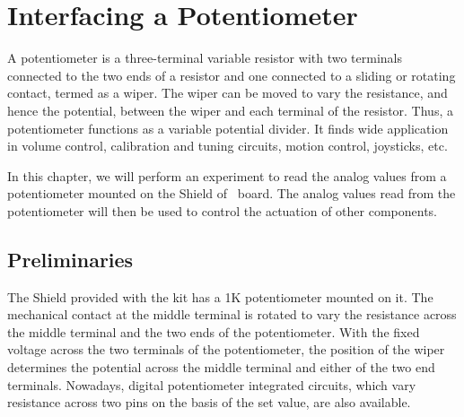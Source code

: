 \chapter{Interfacing a Potentiometer}
\thispagestyle{empty}
\label{potmeter}

\newcommand{\LocPotfig}{\Origin/user-code/pot/figures}
\newcommand{\LocPotscicode}{\Origin/user-code/pot/scilab}
\newcommand{\LocPotscibrief}[1]{{\tt
    \seqsplit{Origin/user-code/pot/scilab/#1}}, 
see \fnrefp{fn:file-loc}}
\newcommand{\LocPotardcode}{\Origin/user-code/pot/arduino}
\newcommand{\LocPotardbrief}[1]{{\tt
    \seqsplit{Origin/user-code/pot/arduino/#1}},
see \fnrefp{fn:file-loc}}

\newcommand{\LocPotpycode}{\Origin/user-code/pot/python}
\newcommand{\LocPotpybrief}[1]{{\tt
    \seqsplit{Origin/user-code/pot/python/#1}},
see \fnrefp{fn:file-loc}}

\newcommand{\LocPotjuliacode}{\Origin/user-code/pot/julia}
\newcommand{\LocPotjuliabrief}[1]{{\tt
    \seqsplit{Origin/user-code/pot/julia/#1}},
see \fnrefp{fn:file-loc}}

\newcommand{\LocPotOpenModelicacode}{\Origin/user-code/pot/OpenModelica}
\newcommand{\LocPotOpenModelicabrief}[1]{{\tt
    \seqsplit{Origin/user-code/pot/OpenModelica/#1}},
see \fnrefp{fn:file-loc}}

A potentiometer is a three-terminal variable resistor with two
terminals connected to the two ends of a resistor and one connected to
a sliding or rotating contact, termed as a wiper. The wiper can be
moved to vary the resistance, and hence the potential, between the
wiper and each terminal of the resistor. Thus, a potentiometer
functions as a variable potential divider. It finds wide application
in volume control, calibration and tuning circuits, motion control,
joysticks, etc.

In this chapter, we will perform an experiment to read the analog
values from a potentiometer mounted on the Shield of \arduino\
board. The analog values read from the potentiometer will then be
used to control the actuation of other components.

\section{Preliminaries}
The Shield provided with the kit has a 1K potentiometer mounted on
it. The mechanical contact at the middle terminal is rotated to vary
the resistance across the middle terminal and the two ends of the
potentiometer. With the fixed voltage across the two terminals of the
potentiometer, the position of the wiper determines the potential
across the middle terminal and either of the two end
terminals. Nowadays, digital potentiometer integrated circuits, which
vary resistance across two pins on the basis of the set value, are
also available.

